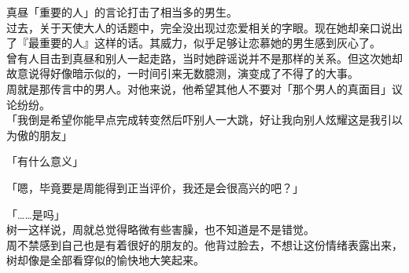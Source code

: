 真昼「重要的人」的言论打击了相当多的男生。\\

过去，关于天使大人的话题中，完全没出现过恋爱相关的字眼。现在她却亲口说出了『最重要的人』这样的话。其威力，似乎足够让恋慕她的男生感到灰心了。\\

曾有人目击到真昼和别人一起走路，当时她辟谣说并不是那样的关系。但这次她却故意说得好像暗示似的，一时间引来无数臆测，演变成了不得了的大事。\\

周就是那传言中的男人。对他来说，他希望其他人不要对「那个男人的真面目」议论纷纷。\\

「我倒是希望你能早点完成转变然后吓别人一大跳，好让我向别人炫耀这是我引以为傲的朋友」

「有什么意义」

「嗯，毕竟要是周能得到正当评价，我还是会很高兴的吧？」

「……是吗」\\

树一这样说，周就总觉得略微有些害臊，也不知道是不是错觉。\\

周不禁感到自己也是有着很好的朋友的。他背过脸去，不想让这份情绪表露出来，树却像是全部看穿似的愉快地大笑起来。
